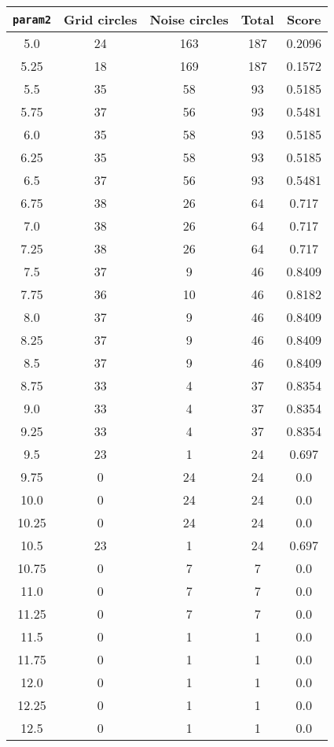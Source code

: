 \documentclass[letterpaper, 12pt]{article}
\begin{document}
\begin{longtable}{|c|c|c|c|c|}
\hline
\textbf{\texttt{param2}} & \textbf{Grid circles} & \textbf{Noise circles} & \textbf{Total} & \textbf{Score} \\
\hline
5.0 & 24 & 163 & 187 & 0.2096 \\
\hline
5.25 & 18 & 169 & 187 & 0.1572 \\
\hline
5.5 & 35 & 58 & 93 & 0.5185 \\
\hline
5.75 & 37 & 56 & 93 & 0.5481 \\
\hline
6.0 & 35 & 58 & 93 & 0.5185 \\
\hline
6.25 & 35 & 58 & 93 & 0.5185 \\
\hline
6.5 & 37 & 56 & 93 & 0.5481 \\
\hline
6.75 & 38 & 26 & 64 & 0.717 \\
\hline
7.0 & 38 & 26 & 64 & 0.717 \\
\hline
7.25 & 38 & 26 & 64 & 0.717 \\
\hline
7.5 & 37 & 9 & 46 & 0.8409 \\
\hline
7.75 & 36 & 10 & 46 & 0.8182 \\
\hline
8.0 & 37 & 9 & 46 & 0.8409 \\
\hline
8.25 & 37 & 9 & 46 & 0.8409 \\
\hline
8.5 & 37 & 9 & 46 & 0.8409 \\
\hline
8.75 & 33 & 4 & 37 & 0.8354 \\
\hline
9.0 & 33 & 4 & 37 & 0.8354 \\
\hline
9.25 & 33 & 4 & 37 & 0.8354 \\
\hline
9.5 & 23 & 1 & 24 & 0.697 \\
\hline
9.75 & 0 & 24 & 24 & 0.0 \\
\hline
10.0 & 0 & 24 & 24 & 0.0 \\
\hline
10.25 & 0 & 24 & 24 & 0.0 \\
\hline
10.5 & 23 & 1 & 24 & 0.697 \\
\hline
10.75 & 0 & 7 & 7 & 0.0 \\
\hline
11.0 & 0 & 7 & 7 & 0.0 \\
\hline
11.25 & 0 & 7 & 7 & 0.0 \\
\hline
11.5 & 0 & 1 & 1 & 0.0 \\
\hline
11.75 & 0 & 1 & 1 & 0.0 \\
\hline
12.0 & 0 & 1 & 1 & 0.0 \\
\hline
12.25 & 0 & 1 & 1 & 0.0 \\
\hline
12.5 & 0 & 1 & 1 & 0.0 \\

\end{longtable}
\end{document}

